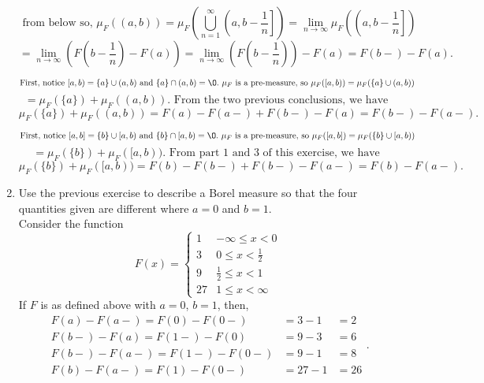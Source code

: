 \begin{enumerate}
 \[
 \text{  from below so,  } \mu_F ((a,b)) = \mu_F \left( \bigcup_{n=1}^\infty \left(a, b- \frac{1}{n}\right] \right)=\lim_{n \rightarrow \infty} \mu_F \left(\left(a, b- \frac{1}{n}\right] \right)
\]
\[
= \lim_{n \rightarrow \infty} \left( F\left(b - \frac{1}{n}\right) - F\left(a\right) \right) = \lim_{n \rightarrow \infty} \left( F\left(b - \frac{1}{n}\right) \right) - F\left(a\right) =F(b-)-F(a) .
\]
\begin{center}\fbox{ Prove $  \ \mu_F([a,b))=F(b-)-F(a-)$}\end{center}
\[
\text{First, notice } [a,b) = \{a\} \cup (a,b)  \text{ and } \{a\} \cap (a,b)= \O . \ \mu_F \text{ is a pre-measure, so  } \mu_F ([a,b)) = \mu_F(\{a\} \cup (a,b))
\]
 \[
 = \mu_F(\{ a \}) + \mu_F((a,b)). \text{ From the two previous conclusions, we have }
\]
\[ \mu_F(\{ a \}) + \mu_F((a,b)) =F(a)-F(a-)+F(b-)-F(a)=F(b-)-F(a-).
\]
\begin{center}\end{center}
\[
\text{First, notice } [a,b] = \{b\} \cup [a,b)  \text{ and } \{b\} \cap [a,b)= \O . \ \mu_F \text{ is a pre-measure, so  } \mu_F ([a,b]) = \mu_F(\{b\} \cup [a,b))
\]
 \[
 = \mu_F(\{ b \}) + \mu_F([a,b)). \text{ From part 1 and 3 of this exercise, we have }
\]
\[ \mu_F(\{ b \}) + \mu_F([a,b)) =F(b)-F(b-)+F(b-)-F(a-)=F(b)-F(a-).
\]


\item Use the previous exercise to describe a Borel measure so that the four quantities given are different where $a = 0$ and $b = 1$. \\
 Consider the function
 \[
 F(x)= \left\{
 \begin{array}{ll}
 	1 & -\infty \leq x < 0\\
 	3 & 0 \leq x < \frac{1}{2}\\
 	9 & \frac{1}{2} \leq x < 1\\
 	27 & 1 \leq x < \infty
 \end{array}
 \right.
 \]
 If $F$ is as defined above with $a=0$, $b = 1$, then, 
 \[
  \begin{array}{lll}
 	F(a)-F(a-)=F(0) -F(0-)& = 3-1&=2\\
 	F(b-)-F(a) =F(1-) -F(0)& = 9-3&=6\\
 	F(b-)-F(a-) =F(1-) -F(0-)& = 9-1&=8\\
 	F(b)-F(a-) =F(1) -F(0-)& = 27-1&=26
 \end{array}.
 \]
 
\end{enumerate}
